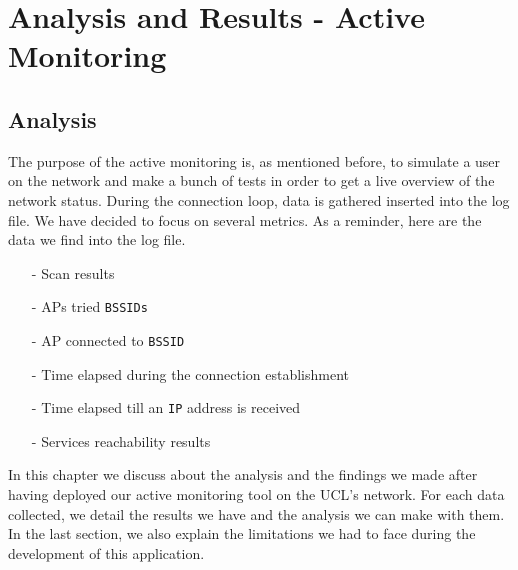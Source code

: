 
\chapter{Analysis and Results - Active Monitoring} %

\label{Chapter6} %




\section{Analysis}
The purpose of the active monitoring is, as mentioned before, to simulate a user on the network and make a bunch of tests in order to get a live overview of the network status. During the connection loop, data is gathered inserted into the log file. We have decided to focus on several metrics. As a reminder, here are the data we find into the log file.

\begin{itemize}
	\item [-] Scan results
	\item [-] APs tried \texttt{BSSIDs}
	\item [-] AP connected to \texttt{BSSID}
	\item [-] Time elapsed during the connection establishment
	\item [-] Time elapsed till an \texttt{IP} address is received
	\item [-] Services reachability results
\end{itemize}

In this chapter we discuss about the analysis and the findings we made after having deployed our active monitoring tool on the UCL's network. For each data collected, we detail the results we have and the analysis we can make with them. In the last section, we also explain the limitations we had to face during the development of this application.

